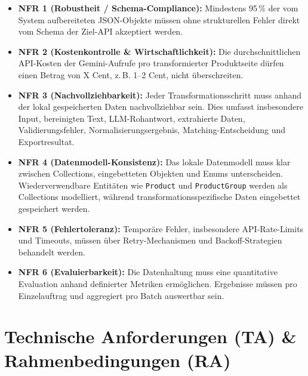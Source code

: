\documentclass[11pt,a4paper]{article}
\begin{document}
\begin{itemize}[leftmargin=*]
    \item \textbf{NFR 1 (Robustheit / Schema-Compliance):} Mindestens 95\,\% der vom System aufbereiteten JSON-Objekte müssen ohne strukturellen Fehler direkt vom Schema der Ziel-API akzeptiert werden.
    
    \item \textbf{NFR 2 (Kostenkontrolle \& Wirtschaftlichkeit):} Die durchschnittlichen API-Kosten der Gemini-Aufrufe pro transformierter Produktseite dürfen einen Betrag von X Cent, z.\,B. 1--2 Cent, nicht überschreiten.
    
    \item \textbf{NFR 3 (Nachvollziehbarkeit):} Jeder Transformationsschritt muss anhand der lokal gespeicherten Daten nachvollziehbar sein. Dies umfasst insbesondere Input, bereinigten Text, LLM-Rohantwort, extrahierte Daten, Validierungsfehler, Normalisierungsergebnis, Matching-Entscheidung und Exportresultat.
    
    \item \textbf{NFR 4 (Datenmodell-Konsistenz):} Das lokale Datenmodell muss klar zwischen Collections, eingebetteten Objekten und Enums unterscheiden. Wiederverwendbare Entitäten wie \texttt{Product} und \texttt{ProductGroup} werden als Collections modelliert, während transformationsspezifische Daten eingebettet gespeichert werden.
    
    \item \textbf{NFR 5 (Fehlertoleranz):} Temporäre Fehler, insbesondere API-Rate-Limits und Timeouts, müssen über Retry-Mechanismen und Backoff-Strategien behandelt werden.
    
    \item \textbf{NFR 6 (Evaluierbarkeit):} Die Datenhaltung muss eine quantitative Evaluation anhand definierter Metriken ermöglichen. Ergebnisse müssen pro Einzelauftrag und aggregiert pro Batch auswertbar sein.
\end{itemize}

\section{Technische Anforderungen (TA) \& Rahmenbedingungen (RA)}
\end{document}
